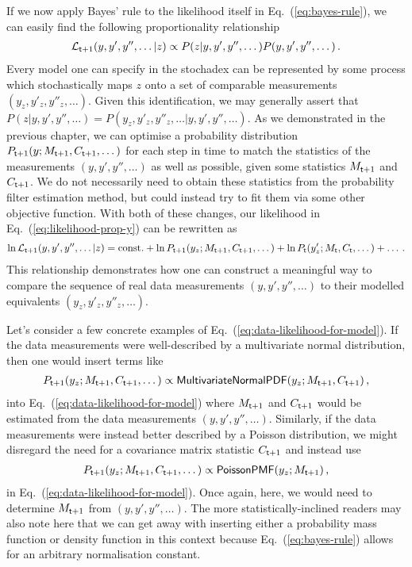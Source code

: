 If we now apply Bayes' rule to the likelihood itself in Eq.~(\ref{eq:bayes-rule}), we can easily find the following proportionality relationship
\begin{align}
{\cal L}_{{\sf t}+1}(y, y',y'', \dots\vert z) \propto P(z\vert y, y',y'', \dots)P(y, y',y'', \dots) \label{eq:likelihood-prop-y}\,.
\end{align}
Every model one can specify in the stochadex can be represented by some process which stochastically maps $z$ onto a set of comparable measurements $(y_z, y'_z,y''_z, \dots)$. Given this identification, we may generally assert that $P(z\vert y, y',y'', \dots)=P(y_z, y'_z,y''_z, \dots\vert y, y',y'', \dots)$. As we demonstrated in the previous chapter, we can optimise a probability distribution $P_{{\sf t}+1}(y;M_{{\sf t}+1},C_{{\sf t}+1}, \dots)$ for each step in time to match the statistics of the measurements $(y, y', y'', \dots)$ as well as possible, given some statistics $M_{{\sf t}+1}$ and $C_{{\sf t}+1}$. We do not necessarily need to obtain these statistics from the probability filter estimation method, but could instead try to fit them via some other objective function. With both of these changes, our likelihood in Eq.~(\ref{eq:likelihood-prop-y}) can be rewritten as
\begin{align}
\ln {\cal L}_{{\sf t}+1}(y, y',y'', \dots\vert z) = {\rm const.} + \ln P_{{\sf t}+1}(y_z;M_{{\sf t}+1},C_{{\sf t}+1},\dots ) + \ln P_{{\sf t}}(y'_z;M_{{\sf t}},C_{{\sf t}},\dots ) + \dots \label{eq:data-likelihood-for-model} \,.
\end{align}
This relationship demonstrates how one can construct a meaningful way to compare the sequence of real data measurements $(y, y', y'', \dots)$ to their modelled equivalents $(y_z, y'_z, y''_z, \dots)$.

Let's consider a few concrete examples of Eq.~(\ref{eq:data-likelihood-for-model}). If the data measurements were well-described by a multivariate normal distribution, then one would insert terms like
\begin{align}
P_{{\sf t}+1}(y_z;M_{{\sf t}+1},C_{{\sf t}+1},\dots ) \propto {\sf MultivariateNormalPDF}(y_z;M_{{\sf t}+1},C_{{\sf t}+1})\,,
\end{align}
into Eq.~(\ref{eq:data-likelihood-for-model}) where $M_{{\sf t}+1}$ and $C_{{\sf t}+1}$ would be estimated from the data measurements $(y, y', y'', \dots)$. Similarly, if the data measurements were instead better described by a Poisson distribution, we might disregard the need for a covariance matrix statistic $C_{{\sf t}+1}$ and instead use
\begin{align}
P_{{\sf t}+1}(y_z;M_{{\sf t}+1},C_{{\sf t}+1},\dots ) \propto {\sf PoissonPMF}(y_z;M_{{\sf t}+1})\,,
\end{align}
in Eq.~(\ref{eq:data-likelihood-for-model}). Once again, here, we would need to determine $M_{{\sf t}+1}$ from $(y, y', y'', \dots)$. The more statistically-inclined readers may also note here that we can get away with inserting either a probability mass function or density function in this context because Eq.~(\ref{eq:bayes-rule}) allows for an arbitrary normalisation constant.

